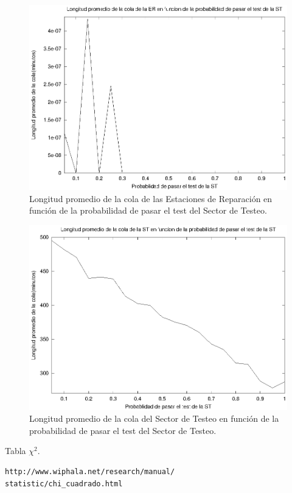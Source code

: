 \documentclass[a4paper,10pt]{article}
\begin{document}
\begin{figure}[ht]
\begin{center}
\includegraphics[width=15cm]{./img/ql_ER.eps}
\caption{\label{fig:ql_ER} Longitud promedio de la cola de las Estaciones de Reparaci\'on en funci\'on de la probabilidad de pasar el test del Sector de Testeo.}
\end{center}
\end{figure}

\begin{figure}[ht]
\begin{center}
\includegraphics[width=15cm]{./img/ql_ST.eps}
\caption{\label{fig:ql_ST} Longitud promedio de la cola del Sector de Testeo en funci\'on de la probabilidad de pasar el test del Sector de Testeo.}
\end{center}
\end{figure}

\begin{thebibliography}{10}
 Tabla $\chi^{2}$.
\begin{verbatim}
http://www.wiphala.net/research/manual/
statistic/chi_cuadrado.html
\end{verbatim}
\end{thebibliography}
\end{document}
